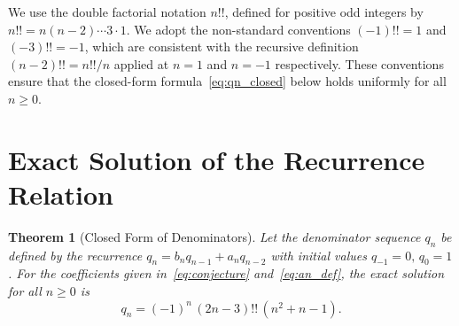 \documentclass[11pt,reqno]{amsart}
\newtheorem{theorem}{Theorem}[section]
\theoremstyle{definition}
\begin{document}
We use the double factorial notation $n!!$, defined for positive odd
integers by $n!! = n(n-2)\cdots 3\cdot 1$. We adopt the non-standard
conventions $(-1)!! = 1$ and $(-3)!! = -1$, which are consistent with the
recursive definition $(n-2)!! = n!!/n$ applied at $n = 1$ and $n = -1$
respectively. These conventions ensure that the closed-form
formula~\eqref{eq:qn_closed} below holds uniformly for all $n\ge 0$.

\section{Exact Solution of the Recurrence Relation}

\begin{theorem}[Closed Form of Denominators]\label{thm:closed_form}
  Let the denominator sequence $q_n$ be defined by the recurrence
  $q_n = b_n q_{n-1} + a_n q_{n-2}$ with initial values $q_{-1}=0,\,q_0=1$.
  For the coefficients given in~\eqref{eq:conjecture} and~\eqref{eq:an_def},
  the exact solution for all $n\ge 0$ is
  \begin{equation}\label{eq:qn_closed}
    q_n = (-1)^n\,(2n-3)!!\,(n^2+n-1).
  \end{equation}
\end{theorem}
\end{document}

